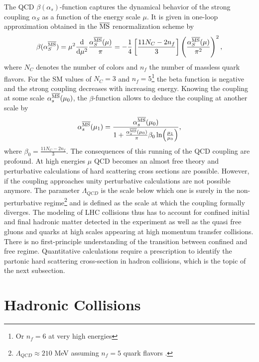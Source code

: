 The QCD $\beta(\alpha_s)$-function captures the dynamical
behavior of the strong coupling $\alpha_S$ as a function of the energy scale $\mu$. It is given in one-loop approximation
obtained in the $\overline{\text{MS}}$ renormalization scheme by
\begin{align}
  \beta(\alpha_S^{\overline{\text{MS}}})=\mu^2\dv{\mu^2}\frac{\alpha_S^{\overline{\text{MS}}}(\mu)}{\pi}
  =-\frac{1}{4}\left[\frac{11N_C-2n_f}{3} \right]\left(\frac{\alpha_S^{\overline{\text{MS}}}(\mu)}{\pi^2} \right)^2,
\end{align}
where $N_C$ denotes the number of colors and $n_f$ the number of massless quark
flavors. For the SM values of
$N_C=3$ and $n_f=5$\footnote{Or $n_f=6$ at very high energies} the beta function is negative and the strong coupling decreases with increasing
energy. Knowing
the coupling at some scale $\asms[\mu_0]$, the $\beta$-function allows
to deduce the coupling at another scale by
\begin{align}
  \asms[\mu_1]=\frac{\asms[\mu_0]}{1+\frac{\asms[\mu_0]}{\pi}\beta_0\ln(\frac{\mu_1}{\mu_0})},
\end{align}
where $\beta_0=\frac{11 N_C-2n_f}{3}$. The consequences of this running
of the QCD coupling are profound. At high energies
$\mu$ QCD becomes an almost free theory and perturbative
calculations of hard scattering cross sections are possible. However, if the coupling approaches unity perturbative
calculations are not possible anymore. The parameter $\Lambda_{QCD}$ is the scale below which one is surely in the non-perturbative regime\footnote{$\Lambda_{QCD}\approx 210$ MeV
  assuming $n_f=5$ quark flavors \cite{Patrignani:2016xqp}.} and is defined
as the scale at which the coupling formally diverges. The
modeling of LHC collisions thus has to account for confined initial and final hadronic matter detected in the experiment as well as the quasi free
gluons and quarks at high scales appearing at high momentum transfer
collisions. There is no
first-principle understanding of the transition
between confined and free regime. Quantitative
calculations require a prescription to identify the partonic hard scattering cross-section in
hadron collisions, which is the topic of the next subsection.




\section{Hadronic Collisions}
\label{sec:hadcoll}

